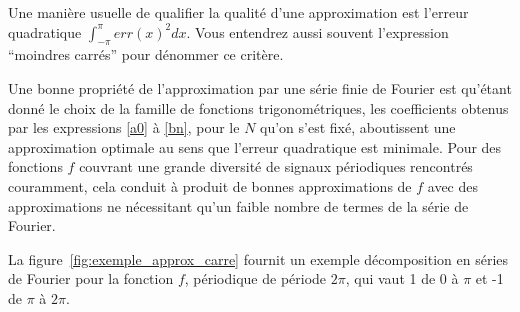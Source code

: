 Une manière usuelle de qualifier la qualité d'une approximation est
l'erreur quadratique $\int_{-\pi}^{\pi}err(x)^2 dx$.
Vous entendrez aussi souvent l'expression ``moindres carrés'' pour
dénommer ce critère.

Une bonne propriété de l'approximation par une série finie de
Fourier est qu'étant donné le choix de la famille de fonctions
trigonométriques, les coefficients obtenus par les expressions
\ref{a0} à \ref{bn}, pour le $N$ qu'on s'est fixé, aboutissent une
approximation optimale au sens que l'erreur quadratique est minimale.
Pour des fonctions $f$ couvrant une grande diversité de signaux périodiques rencontrés couramment, cela conduit à produit de bonnes approximations de $f$ avec des approximations ne nécessitant qu'un faible nombre de termes de la série de Fourier.

La figure~\ref{fig:exemple_approx_carre} fournit un exemple décomposition en séries de Fourier pour la fonction $f$, périodique de période $2\pi$, qui vaut 1 de 0 à $\pi$ et -1 de $\pi$ à $2\pi$. 

